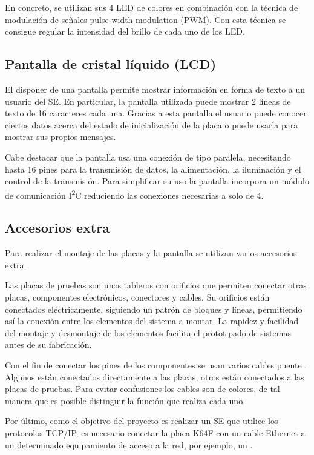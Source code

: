 
En concreto, se utilizan sus 4 LED de colores en combinación con la técnica de
modulación de señales pulse-width modulation (PWM). Con esta técnica se consigue
regular la intensidad del brillo de cada uno de los LED.

\subsection{Pantalla de cristal líquido (LCD)}{\label{sec:lcd}}
El disponer de una pantalla permite mostrar información en forma de texto a un
usuario del SE. En particular, la pantalla utilizada puede mostrar 2 líneas de
texto de 16 caracteres cada una. Gracias a esta pantalla el usuario puede
conocer ciertos datos acerca del estado de inicialización de la placa o puede
usarla para mostrar sus propios mensajes.

Cabe destacar que la pantalla usa una conexión de tipo paralela, necesitando
hasta 16 pines para la transmisión de datos, la alimentación, la iluminación y
el control de la transmisión. Para simplificar su uso la pantalla incorpora un
módulo de comunicación I\textsuperscript{2}C reduciendo las conexiones
necesarias a solo de 4.

\subsection{Accesorios extra}{\label{sec:extras}}
Para realizar el montaje de las placas y la pantalla se utilizan varios
accesorios extra.

Las placas de pruebas \cite{webpage:placa-pruebas} son unos tableros con
orificios que permiten conectar otras placas, componentes electrónicos,
conectores y cables. Su orificios están conectados eléctricamente, siguiendo un
patrón de bloques y líneas, permitiendo así la conexión entre los elementos del
sistema a montar. La rapidez y facilidad del montaje y desmontaje de los
elementos facilita el prototipado de sistemas antes de su fabricación.

Con el fin de conectar los pines de los componentes se usan varios cables
puente \cite{webpage:cable-puente}. Algunos están conectados directamente a las
placas, otros están conectados a las placas de pruebas. Para evitar confusiones
los cables son de colores, de tal manera que es posible distinguir la función
que realiza cada uno.

Por último, como el objetivo del proyecto es realizar un SE que utilice los
protocolos TCP/IP, es necesario conectar la placa K64F con un cable Ethernet
a un determinado equipamiento de acceso a la red, por ejemplo,
un .


